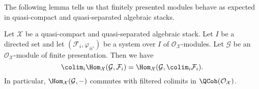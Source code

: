 \noindent
The following lemma tells us that finitely presented modules behave
as expected in quasi-compact and quasi-separated algebraic stacks.

\begin{lemma}
\label{lemma-finite-presentation-quasi-compact-colimit}
Let $\mathcal{X}$ be a quasi-compact and quasi-separated algebraic stack.
Let $I$ be a directed set and let $(\mathcal{F}_i, \varphi_{ii'})$ be a
system over $I$ of $\mathcal{O}_\mathcal{X}$-modules. Let $\mathcal{G}$ be an
$\mathcal{O}_\mathcal{X}$-module of finite presentation. Then we have
$$
\colim_i \Hom_\mathcal{X}(\mathcal{G}, \mathcal{F}_i)
=
\Hom_\mathcal{X}(\mathcal{G}, \colim_i \mathcal{F}_i).
$$
In particular, $\Hom_\mathcal{X}(\mathcal{G}, -)$ commutes with filtered
colimits in $\QCoh(\mathcal{O}_\mathcal{X})$.
\end{lemma}

